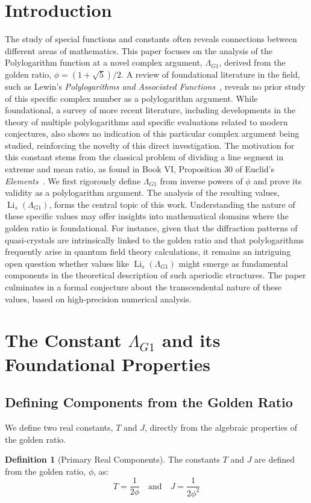 \documentclass{amsart}
\theoremstyle{plain}
\theoremstyle{definition}
\newtheorem{definition}[theorem]{Definition}
\theoremstyle{remark}
\DeclareMathOperator{\Li}{Li} %
\newcommand{\LambdaG}{\Lambda_{G1}}
\newcommand{\phiG}{\phi}
\begin{document}
\section{Introduction}
The study of special functions and constants often reveals connections between different areas of mathematics. This paper focuses on the analysis of the Polylogarithm function at a novel complex argument, $\LambdaG$, derived from the golden ratio, $\phiG = (1+\sqrt{5})/2$. A review of foundational literature in the field, such as Lewin's \textit{Polylogarithms and Associated Functions}~\cite{Lewin}, reveals no prior study of this specific complex number as a polylogarithm argument. While foundational, a survey of more recent literature, including developments in the theory of multiple polylogarithms and specific evaluations related to modern conjectures, also shows no indication of this particular complex argument being studied, reinforcing the novelty of this direct investigation. %
The motivation for this constant stems from the classical problem of dividing a line segment in extreme and mean ratio, as found in Book VI, Proposition 30 of Euclid's \textit{Elements}~\cite{Euclid}. We first rigorously define $\LambdaG$ from inverse powers of $\phiG$ and prove its validity as a polylogarithm argument. The analysis of the resulting values, $\Li_s(\LambdaG)$, forms the central topic of this work. Understanding the nature of these specific values may offer insights into mathematical domains where the golden ratio is foundational. For instance, given that the diffraction patterns of quasi-crystals are intrinsically linked to the golden ratio and that polylogarithms frequently arise in quantum field theory calculations, it remains an intriguing open question whether values like $\Li_s(\LambdaG)$ might emerge as fundamental components in the theoretical description of such aperiodic structures. The paper culminates in a formal conjecture about the transcendental nature of these values, based on high-precision numerical analysis.

\section{The Constant \texorpdfstring{$\LambdaG$}{Lambda\_G1} and its Foundational Properties}

\subsection{Defining Components from the Golden Ratio}
We define two real constants, $T$ and $J$, directly from the algebraic properties of the golden ratio.
\begin{definition}[Primary Real Components]
The constants $T$ and $J$ are defined from the golden ratio, $\phiG$, as:
\[ T = \frac{1}{2\phiG} \quad \text{and} \quad J = \frac{1}{2\phiG^2} \]
\end{definition}
\end{document}
